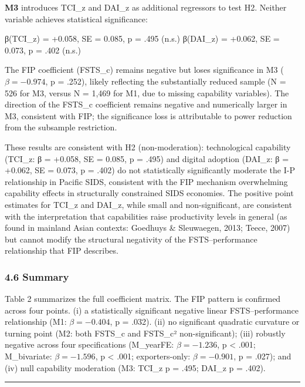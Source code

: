 \documentclass[12pt,a4paper]{article}
\begin{document}
\textbf{M3} introduces TCI\_z and DAI\_z as additional regressors to
test H2. Neither variable achieves statistical significance:

β(TCI\_z) = +0.058, SE = 0.085, p = .495 (n.s.) β(DAI\_z) = +0.062, SE =
0.073, p = .402 (n.s.)

The FIP coefficient (FSTS\_c) remains negative but loses significance in
M3 (\(\beta = −0.974\), p = .252), likely reflecting the substantially
reduced sample (N = 526 for M3, versus N = 1,469 for M1, due to missing
capability variables). The direction of the FSTS\_c coefficient remains
negative and numerically larger in M3, consistent with FIP; the
significance loss is attributable to power reduction from the subsample
restriction.

These results are consistent with H2 (non-moderation): technological
capability (TCI\_z: β = +0.058, SE = 0.085, p = .495) and digital
adoption (DAI\_z: β = +0.062, SE = 0.073, p = .402) do not statistically
significantly moderate the I-P relationship in Pacific SIDS, consistent
with the FIP mechanism overwhelming capability effects in structurally
constrained SIDS economies. The positive point estimates for TCI\_z and
DAI\_z, while small and non-significant, are consistent with the
interpretation that capabilities raise productivity levels in general
(as found in mainland Asian contexts: Goedhuys \& Sleuwaegen, 2013;
Teece, 2007) but cannot modify the structural negativity of the
FSTS--performance relationship that FIP describes.

\hypertarget{46-summary}{%
\subsubsection{4.6 Summary}\label{46-summary}}

Table 2 summarizes the full coefficient matrix. The FIP pattern is
confirmed across four points. (i) a statistically significant negative
linear FSTS--performance relationship (M1: \(\beta = −0.404\), p =
.032). (ii) no significant quadratic curvature or turning point (M2:
both FSTS\_c and FSTS\_c² non-significant); (iii) robustly negative
across four specifications (M\_yearFE: \(\beta = −1.236\), p \textless{}
.001; M\_bivariate: \(\beta = −1.596\), p \textless{} .001;
exporters-only: \(\beta = −0.901\), p = .027); and (iv) null capability
moderation (M3: TCI\_z p = .495; DAI\_z p = .402).

\begin{center}\rule{0.5\linewidth}{0.5pt}\end{center}
\end{document}
